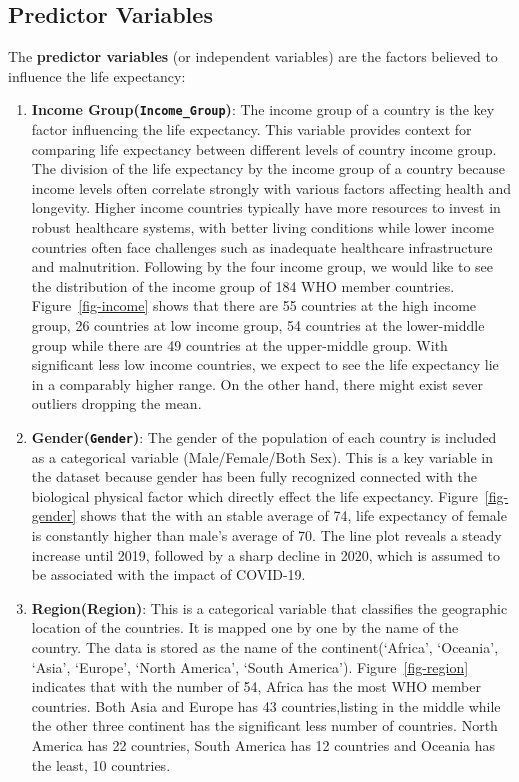 \documentclass[
  letterpaper,
  DIV=11,
  numbers=noendperiod]{scrartcl}
\begin{document}
\subsection{Predictor Variables}\label{predictor-variables}

The \textbf{predictor variables} (or independent variables) are the
factors believed to influence the life expectancy:

\begin{enumerate}
\def\labelenumi{\arabic{enumi}.}
\item
  \textbf{Income Group(\texttt{Income\_Group})}: The income group of a
  country is the key factor influencing the life expectancy. This
  variable provides context for comparing life expectancy between
  different levels of country income group. The division of the life
  expectancy by the income group of a country because income levels
  often correlate strongly with various factors affecting health and
  longevity. Higher income countries typically have more resources to
  invest in robust healthcare systems, with better living conditions
  while lower income countries often face challenges such as inadequate
  healthcare infrastructure and malnutrition. Following by the four
  income group, we would like to see the distribution of the income
  group of 184 WHO member countries. Figure~\ref{fig-income} shows that
  there are 55 countries at the high income group, 26 countries at low
  income group, 54 countries at the lower-middle group while there are
  49 countries at the upper-middle group. With significant less low
  income countries, we expect to see the life expectancy lie in a
  comparably higher range. On the other hand, there might exist sever
  outliers dropping the mean.
\item
  \textbf{Gender(\texttt{Gender})}: The gender of the population of each
  country is included as a categorical variable (Male/Female/Both Sex).
  This is a key variable in the dataset because gender has been fully
  recognized connected with the biological physical factor which
  directly effect the life expectancy. Figure~\ref{fig-gender} shows
  that the with an stable average of 74, life expectancy of female is
  constantly higher than male's average of 70. The line plot reveals a
  steady increase until 2019, followed by a sharp decline in 2020, which
  is assumed to be associated with the impact of COVID-19.
\item
  \textbf{Region(Region)}: This is a categorical variable that
  classifies the geographic location of the countries. It is mapped one
  by one by the name of the country. The data is stored as the name of
  the continent(`Africa', `Oceania', `Asia', `Europe', `North America',
  `South America'). Figure~\ref{fig-region} indicates that with the
  number of 54, Africa has the most WHO member countries. Both Asia and
  Europe has 43 countries,listing in the middle while the other three
  continent has the significant less number of countries. North America
  has 22 countries, South America has 12 countries and Oceania has the
  least, 10 countries.
\end{enumerate}
\end{document}
